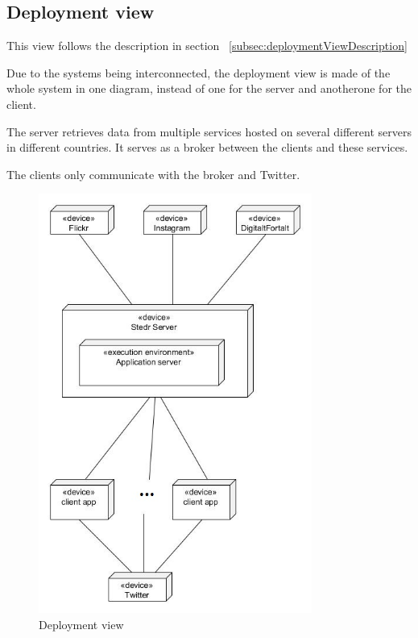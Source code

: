 \documentclass[11pt]{book}
\begin{document}
\subsection{Deployment view}
This view follows the description in section ~\ref{subsec:deploymentViewDescription}

Due to the systems being interconnected, the deployment view is made of the whole system in one diagram, instead of one for the server and anotherone for the client.

The server retrieves data from multiple services hosted on several different servers in different countries. It serves as a broker between the clients and these services.

The clients only communicate with the broker and Twitter.

\begin{figure}[H]
      \centering
      \includegraphics[width=0.8\textwidth]{Figures/Architecture/deploymentView.jpg}
      \caption{Deployment view}
      \label{fig:arch_deployment}
\end{figure}
\end{document}
